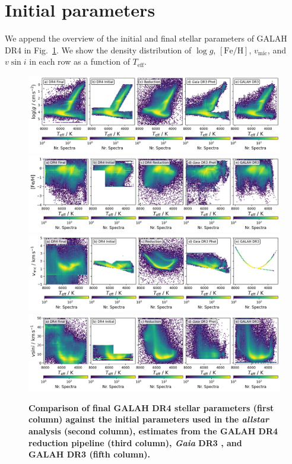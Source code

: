 \documentclass[
  journal=pasa,
  manuscript=research-paper, %
  year=2024,
  volume=37
]{cup-journal}
\newcommand{\Teff}{$T_\mathrm{eff}$\xspace}
\newcommand{\logg}{$\log g$\xspace}
\newcommand{\feh}{$\mathrm{[Fe/H]}$\xspace}
\newcommand{\vmic}{$v_\mathrm{mic}$\xspace}
\newcommand{\vsini}{$v \sin i$\xspace}
\newcommand{\Gaia}{\textit{Gaia}\xspace}
\begin{document}
\appendix

\section{Initial parameters}

We append the overview of the initial and final stellar parameters of GALAH DR4 in Fig.~\ref{fig:initial_parameters}. We show the density distribution of \logg, \feh, \vmic, and \vsini in each row as a function of \Teff.

\begin{figure}[ht]
 \centering
 \includegraphics[width=\textwidth]{figures/initial_teff_logg.png}
 \includegraphics[width=\textwidth]{figures/initial_teff_fe_h.png}
 \includegraphics[width=\textwidth]{figures/initial_teff_vmic.png}
 \includegraphics[width=\textwidth]{figures/initial_teff_vsini.png} \caption{\textbf{Comparison of final GALAH DR4 stellar parameters (first column) against the initial parameters used in the \textit{allstar} analysis (second column), estimates from the GALAH DR4 reduction pipeline (third column), \Gaia DR3 \citep[fourth column with \vmic based on the adjusted formula from ][]{DutraFerreira2016}, and GALAH DR3 (fifth column).}} \label{fig:initial_parameters}
\end{figure}
\end{document}

